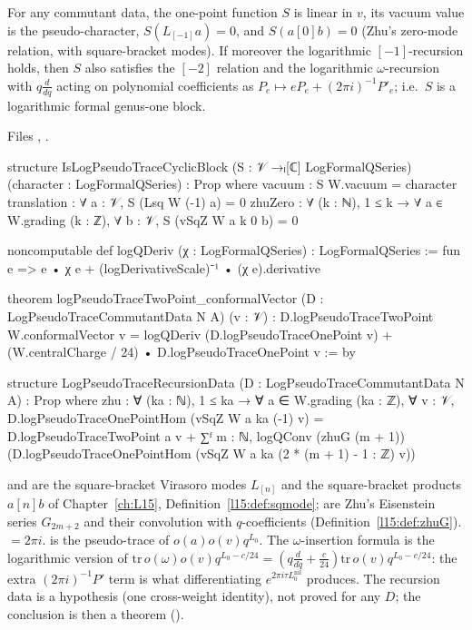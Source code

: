 \begin{theorem}\label{l18:thm:logblock}
For any commutant data, the one-point function $S$ is linear in $v$, its vacuum value is the pseudo-character,
$S(L_{[-1]}a)=0$, and $S(a[0]b)=0$ (Zhu's zero-mode relation, with square-bracket modes). If moreover the logarithmic
$[-1]$-recursion  holds, then $S$ also satisfies the $[-2]$ relation and the
logarithmic $\omega$-recursion with $q\frac d{dq}$ acting on polynomial coefficients as
$P_e\mapsto eP_e+(2\pi i)^{-1}P'_e$; i.e.\ $S$ is a logarithmic formal genus-one block.
\end{theorem}
\noindent Files ,
.
\begin{leancode}
structure IsLogPseudoTraceCyclicBlock
    (S : 𝒱 →ₗ[ℂ] LogFormalQSeries) (character : LogFormalQSeries) : Prop where
  vacuum : S W.vacuum = character
  translation : ∀ a : 𝒱, S (Lsq W (-1) a) = 0
  zhuZero : ∀ (k : ℕ), 1 ≤ k → ∀ a ∈ W.grading (k : ℤ), ∀ b : 𝒱,
    S (vSqZ W a k 0 b) = 0
\end{leancode}
\begin{leancode}
noncomputable def logQDeriv (χ : LogFormalQSeries) : LogFormalQSeries :=
  fun e => e • χ e + (logDerivativeScale)⁻¹ • (χ e).derivative

theorem logPseudoTraceTwoPoint_conformalVector
    (D : LogPseudoTraceCommutantData N A) (v : 𝒱) :
    D.logPseudoTraceTwoPoint W.conformalVector v =
      logQDeriv (D.logPseudoTraceOnePoint v) +
        (W.centralCharge / 24) • D.logPseudoTraceOnePoint v := by

structure LogPseudoTraceRecursionData (D : LogPseudoTraceCommutantData N A) : Prop where
  zhu : ∀ (ka : ℕ), 1 ≤ ka → ∀ a ∈ W.grading (ka : ℤ), ∀ v : 𝒱,
    D.logPseudoTraceOnePointHom (vSqZ W a ka (-1) v) =
      D.logPseudoTraceTwoPoint a v +
        ∑ᶠ m : ℕ, logQConv (zhuG (m + 1))
          (D.logPseudoTraceOnePointHom
            (vSqZ W a ka (2 * (m + 1) - 1 : ℤ) v))
\end{leancode}
\begin{dictionary}
 and  are the square-bracket Virasoro modes $L_{[n]}$ and the square-bracket
products $a[n]b$ of Chapter~\ref{ch:L15}, Definition~\ref{l15:def:sqmode};  are Zhu's Eisenstein
series $G_{2m+2}$ and  their convolution with $q$-coefficients (Definition~\ref{l15:def:zhuG}).
 $=2\pi i$.  is the pseudo-trace of $o(a)o(v)q^{L_0}$. The
$\omega$-insertion formula is the logarithmic version of $\mathrm{tr}\,o(\omega)o(v)q^{L_0-c/24}=(q\frac d{dq}+\frac c{24})\mathrm{tr}\,o(v)q^{L_0-c/24}$:
the extra $(2\pi i)^{-1}P'$ term is what differentiating $e^{2\pi i\tau L_0^{\mathrm{nil}}}$ produces. The recursion data
is a hypothesis (one cross-weight identity), not proved for any $D$; the conclusion
 is then a theorem ().
\end{dictionary}
